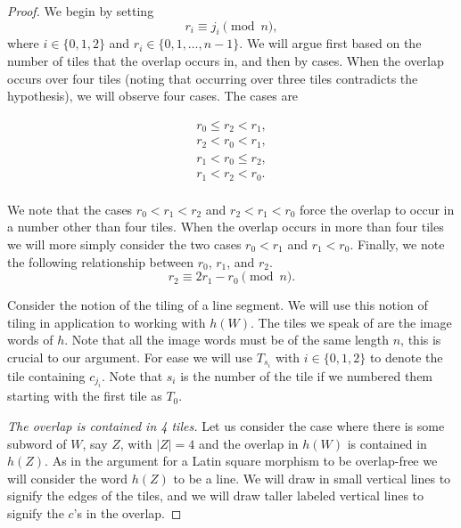 \documentclass[12pt]{amsart}
\theoremstyle{definition}
\theoremstyle{plain}
\theoremstyle{nameit}
\theoremstyle{plain}
\begin{document}
\begin{onehalfspace}
\begin{proof}
We begin by setting
\[r_i\equiv j_i\pmod{n},\]
where $i\in\{0,1,2\}$ and $r_i\in\{0,1,\ldots,n-1\}$. We will argue first based on the number of tiles that the
overlap occurs in, and then by cases. When the overlap occurs over four tiles (noting that occurring over
three tiles contradicts the hypothesis), we will observe four cases. The cases are

\begin{singlespace}
\begin{align*}
r_0\le r_2<r_1,\\
r_2<r_0<r_1,\\
r_1<r_0 \le r_2,\\
r_1<r_2<r_0.\\
\end{align*}
\end{singlespace}

\noindent
We note that the cases $r_0<r_1<r_2$ and $r_2<r_1<r_0$ force the overlap to occur in a number other
than four tiles. When the overlap occurs in more than four tiles we will more simply consider the two
cases $r_0<r_1$ and $r_1<r_0$. Finally, we note the following relationship between $r_0$, $r_1$, and
$r_2$.
\begin{equation}
r_2\equiv 2r_1 - r_0 \pmod{n}.
\label{eq_5_1}
\end{equation}

Consider the notion of the tiling of a line segment. We will use this notion of tiling in application to working
with $h(W)$. The tiles we speak of are the image words of $h$. Note that all the image words must be of
the
same length $n$, this is crucial to our argument. For ease we will use $T_{s_i}$ with $i \in\{0,1,2\}$ to
denote the tile containing $c_{j_i}$. Note that $s_i$ is the number of the tile if we numbered them
starting with the first tile as $T_{0}$.

\emph{The overlap is contained in 4 tiles.} Let us consider the case where there is some subword of $W$,
say $Z$, with $|Z|=4$ and the overlap in $h(W)$ is contained in $h(Z)$. As in the argument for a Latin
square morphism to be overlap-free we will consider the word $h(Z)$ to be a line. We will draw in small
vertical lines to signify the edges of the tiles, and we will draw taller labeled vertical lines to signify the $c
$'s in the overlap.


\end{proof}
\end{onehalfspace}
\end{document}
